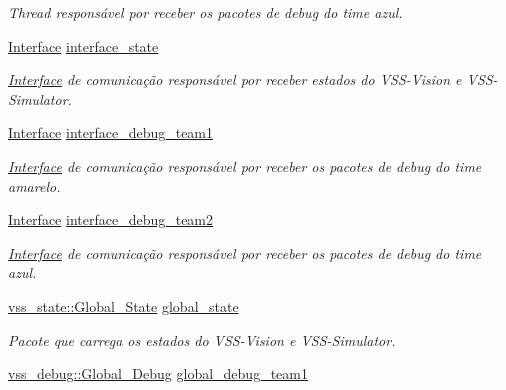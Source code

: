 \begin{DoxyCompactItemize}
\begin{DoxyCompactList}\small\item\em Thread responsável por receber os pacotes de debug do time azul. \end{DoxyCompactList}\item 
\hyperlink{classInterface}{Interface} \hyperlink{classGraphics_a3c5730bb3f5bda9d0727ab14fa3af068}{interface\+\_\+state}\hypertarget{classGraphics_a3c5730bb3f5bda9d0727ab14fa3af068}{}\label{classGraphics_a3c5730bb3f5bda9d0727ab14fa3af068}

\begin{DoxyCompactList}\small\item\em \hyperlink{classInterface}{Interface} de comunicação responsável por receber estados do V\+S\+S-\/\+Vision e V\+S\+S-\/\+Simulator. \end{DoxyCompactList}\item 
\hyperlink{classInterface}{Interface} \hyperlink{classGraphics_a6580b42a3da603d5fc8a40939d518b34}{interface\+\_\+debug\+\_\+team1}\hypertarget{classGraphics_a6580b42a3da603d5fc8a40939d518b34}{}\label{classGraphics_a6580b42a3da603d5fc8a40939d518b34}

\begin{DoxyCompactList}\small\item\em \hyperlink{classInterface}{Interface} de comunicação responsável por receber os pacotes de debug do time amarelo. \end{DoxyCompactList}\item 
\hyperlink{classInterface}{Interface} \hyperlink{classGraphics_a39fd7caa133ce1ad55c527b72812e338}{interface\+\_\+debug\+\_\+team2}\hypertarget{classGraphics_a39fd7caa133ce1ad55c527b72812e338}{}\label{classGraphics_a39fd7caa133ce1ad55c527b72812e338}

\begin{DoxyCompactList}\small\item\em \hyperlink{classInterface}{Interface} de comunicação responsável por receber os pacotes de debug do time azul. \end{DoxyCompactList}\item 
\hyperlink{classvss__state_1_1Global__State}{vss\+\_\+state\+::\+Global\+\_\+\+State} \hyperlink{classGraphics_a319be43d30ac19e414dbc1c3fdb336dc}{global\+\_\+state}\hypertarget{classGraphics_a319be43d30ac19e414dbc1c3fdb336dc}{}\label{classGraphics_a319be43d30ac19e414dbc1c3fdb336dc}

\begin{DoxyCompactList}\small\item\em Pacote que carrega os estados do V\+S\+S-\/\+Vision e V\+S\+S-\/\+Simulator. \end{DoxyCompactList}\item 
\hyperlink{classvss__debug_1_1Global__Debug}{vss\+\_\+debug\+::\+Global\+\_\+\+Debug} \hyperlink{classGraphics_adc864f47fef1f3d4af3f7ee5099d20da}{global\+\_\+debug\+\_\+team1}\hypertarget{classGraphics_adc864f47fef1f3d4af3f7ee5099d20da}{}\label{classGraphics_adc864f47fef1f3d4af3f7ee5099d20da}


\end{DoxyCompactItemize}
